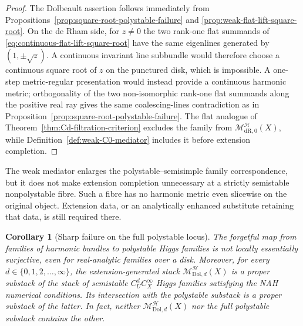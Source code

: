 \documentclass[11pt,reqno]{amsart}
\newtheorem{corollary}[theorem]{Corollary}
\theoremstyle{definition}
\theoremstyle{remark}
\newcommand{\cH}{\mathcal H}
\newcommand{\Dol}{\mathrm{Dol}}
\newcommand{\dR}{\mathrm{dR}}
\begin{document}
\begin{proof}
The Dolbeault assertion follows immediately from Propositions~\ref{prop:square-root-polystable-failure} and \ref{prop:weak-flat-lift-square-root}.  On the de Rham side, for $z\ne0$ the two rank-one flat summands of \eqref{eq:continuous-flat-lift-square-root} have the same eigenlines generated by $(1,\pm\sqrt z)$.  A continuous invariant line subbundle would therefore choose a continuous square root of $z$ on the punctured disk, which is impossible.  A one-step metric-regular presentation would instead provide a continuous harmonic metric; orthogonality of the two non-isomorphic rank-one flat summands along the positive real ray gives the same coalescing-lines contradiction as in Proposition~\ref{prop:square-root-polystable-failure}.  The flat analogue of Theorem~\ref{thm:Cd-filtration-criterion} excludes the family from $\mathscr M_{\dR,0}^{\cH}(X)$, while Definition~\ref{def:weak-C0-mediator} includes it before extension completion.
\end{proof}

The weak mediator enlarges the polystable--semisimple family correspondence, but it does not make extension completion unnecessary at a strictly semistable nonpolystable fibre.  Such a fibre has no harmonic metric even slicewise on the original object.  Extension data, or an analytically enhanced substitute retaining that data, is still required there.

\begin{corollary}[Sharp failure on the full polystable locus]\label{cor:full-polystable-failure}
The forgetful map from families of harmonic bundles to polystable Higgs families is not locally essentially surjective, even for real-analytic families over a disk.  Moreover, for every $d\in\{0,1,2,\ldots,\infty\}$, the extension-generated stack $\mathscr M_{\Dol,d}^{\cH}(X)$ is a proper substack of the stack of semistable $C^d_UC^\infty_X$ Higgs families satisfying the NAH numerical conditions.  Its intersection with the polystable substack is a proper substack of the latter.  In fact, neither $\mathscr M_{\Dol,d}^{\cH}(X)$ nor the full polystable substack contains the other.
\end{corollary}
\end{document}
